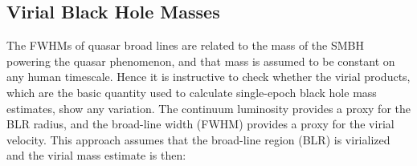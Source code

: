 \documentclass[fleqn,usenatbib]{mnras}
\begin{document}
\subsection{Virial Black Hole Masses}\label{sec:BH_masses} 
The FWHMs of quasar broad lines are related to the mass of the SMBH
powering the quasar phenomenon, and that mass is assumed to be
constant on any human timescale.  Hence it is instructive to check
whether the virial products, which are the basic quantity used to
calculate single-epoch black hole mass estimates, show any
variation. The continuum luminosity provides a proxy for the BLR
radius, and the broad-line width (FWHM) provides a proxy for the
virial velocity. This approach assumes that the broad-line region
(BLR) is virialized \citep[e.g.][]{Shen2008b, Shen2011, Calderone2017,
Mejia-Restrepo2018} and the virial mass estimate is then:
\end{document}
